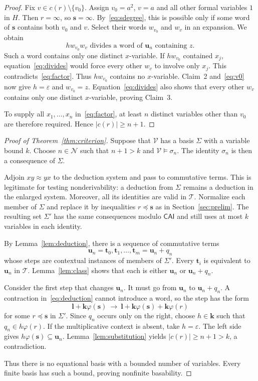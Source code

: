 \documentclass[11pt,reqno]{amsart}
\theoremstyle{remark}
\newcommand{\CAI}{\mathsf{CAI}}
\newcommand{\T}{\mathcal T}
\newcommand{\Ncal}{\mathcal N}
\newcommand{\eps}{\varepsilon}
\newcommand{\bu}{\mathbf u}
\newcommand{\bs}{\mathbf s}
\newcommand{\bt}{\mathbf t}
\newcommand{\bK}{\mathbf k}
\numberwithin{equation}{section}
\begin{document}
\begin{proof}
Fix $v\in c(r)\setminus\{v_0\}$. Assign $v_0=a^2$, $v=a$ and all
other formal variables $1$ in $H$. Then $r=\infty$, so $\bs=\infty$.
By~\eqref{eq:sdegree}, this is possible only if some word of $\bs$
contains both $v_0$ and $v$. Select their words $w_{v_0}$ and $w_v$ in
an expansion. We obtain
\begin{equation}\label{eq:divides}
hw_{v_0}w_v\text{ divides a word of $\bu_n$ containing $z$.}
\end{equation}
Such a word contains only one distinct $x$-variable. If $hw_{v_0}$
contained $x_j$, equation~\eqref{eq:divides} would force every other
$w_v$ to involve only $x_j$. This contradicts~\eqref{eq:factor}.
Thus $hw_{v_0}$ contains no $x$-variable. Claim~2 and~\eqref{eq:v0}
now give $h=\eps$ and $w_{v_0}=z$. Equation~\eqref{eq:divides} also
shows that every other $w_v$ contains only one distinct $x$-variable,
proving Claim~3.

To supply all $x_1,\ldots,x_n$ in~\eqref{eq:factor}, at least $n$
distinct variables other than $v_0$ are therefore required. Hence
$|c(r)|\geq n+1$.
\end{proof}

\begin{proof}[Proof of Theorem~\ref{thm:criterion}]
Suppose that $\mathcal V$ has a basis $\Sigma$ with a variable bound $k$.
Choose $n\in\Ncal$ such that $n+1>k$ and $\mathcal V\models\sigma_n$.
The identity $\sigma_n$ is then a consequence of $\Sigma$.

Adjoin $xy\approx yx$ to the deduction system and pass to commutative
terms. This is legitimate for testing nonderivability: a deduction from
$\Sigma$ remains a deduction in the enlarged system. Moreover, all its
identities are valid in $\T$. Normalize each member of $\Sigma$ and
replace it by inequalities $r\preceq\bs$ as in Section~\ref{sec:prelim}.
The resulting set $\Sigma'$ has the same consequences modulo $\CAI$
and still uses at most $k$ variables in each identity.

By Lemma~\ref{lem:deduction}, there is a sequence of commutative terms
\[
\bu_n=\bt_0,\bt_1,\ldots,\bt_m=\bu_n+q_n
\]
whose steps are contextual instances of members of $\Sigma'$. Every
$\bt_i$ is equivalent to $\bu_n$ in $\T$. Lemma~\ref{lem:class} shows
that each is either $\bu_n$ or $\bu_n+q_n$.

Consider the first step that changes $\bu_n$. It must go from
$\bu_n$ to $\bu_n+q_n$. A contraction in~\eqref{eq:deduction} cannot
introduce a word, so the step has the form
\[
\mathbf l+\bK\varphi(\bs)
\ \longrightarrow\
\mathbf l+\bK\varphi(\bs)+\bK\varphi(r)
\]
for some $r\preceq\bs$ in $\Sigma'$. Since $q_n$ occurs only on the
right, choose $h\in\bK$ such that $q_n\in h\varphi(r)$. If the
multiplicative context is absent, take $h=\eps$. The left side gives
$h\varphi(\bs)\subseteq\bu_n$. Lemma~\ref{lem:substitution} yields
$|c(r)|\geq n+1>k$, a contradiction.

Thus there is no equational basis with a bounded number of variables.
Every finite basis has such a bound, proving nonfinite basability.
\end{proof}
\end{document}
